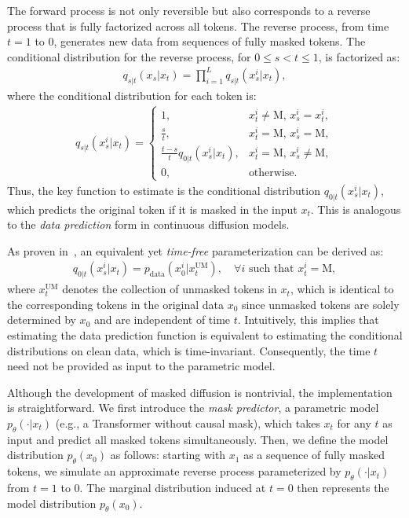 \documentclass{article}
\begin{document}
The forward process is not only reversible but also corresponds to a reverse process that is fully factorized across all tokens. The reverse process, from time \( t = 1 \) to \( 0 \), generates new data from sequences of fully masked tokens. The conditional distribution for the reverse process, for \( 0 \leq s < t \leq 1 \), is factorized as:
\begin{align}
\label{eq:reverse_process}
    q_{s|t}(x_s|x_t) = \prod_{i=1}^{L} q_{s|t}(x_s^i|x_t),
\end{align}
where the conditional distribution for each token is:
\begin{align}
\label{eq:x0_prediction}
    q_{s|t}(x_s^i|x_t) = 
    \begin{cases}
        1, & x_t^i \neq \textrm{M}, \, x_s^i = x_t^i, \\
        \frac{s}{t}, & x_t^i = \textrm{M}, \, x_s^i = \textrm{M}, \\
        \frac{t - s}{t} q_{0|t}(x_s^i|x_t), & x_t^i = \textrm{M}, \, x_s^i \neq \textrm{M}, \\
        0, & \textrm{otherwise}.
    \end{cases}
\end{align}
Thus, the key function to estimate is the conditional distribution \( q_{0|t}(x_s^i|x_t) \), 
which predicts the original token if it is masked in the input \( x_t \). This is analogous to the \emph{data prediction} form in continuous diffusion models. 
 
As proven in~\cite{ou2024your}, an equivalent yet \emph{time-free} parameterization can be derived as:
\begin{align} 
    q_{0|t}(x_s^i|x_t) = p_{\textrm{data}}(x_0^{i}|x_t^{\textrm{UM}}), \quad \forall i \textrm{ such that } x_t^{i} = \textrm{M},
\end{align}
where \( x_t^{\textrm{UM}} \) denotes the collection of unmasked tokens in \( x_t \), 
which is identical to the corresponding tokens in the original data \( x_0 \) since unmasked tokens are solely determined by \( x_0 \) and are independent of time \( t \). Intuitively, this implies that estimating the data prediction function is equivalent to estimating the conditional distributions on clean data, which is time-invariant. Consequently, the time $t$ need not be provided as input to the parametric model.

Although the development of masked diffusion is nontrivial, the implementation is straightforward. We first introduce the \emph{mask predictor}, a parametric model \( p_{\theta}(\cdot|x_t) \) (e.g., a Transformer without causal mask), which takes \( x_t \) for any $t$ as input and predict all masked tokens simultaneously. Then, we define the model distribution $p_\theta(x_0)$ as follows: starting with \( x_1 \) as a sequence of fully masked tokens, we simulate an approximate reverse process parameterized by \(  p_{\theta}(\cdot|x_t) \) from \( t = 1 \) to \( 0 \). The marginal distribution induced at \( t = 0 \) then represents the model distribution $p_\theta(x_0)$.
\end{document}
